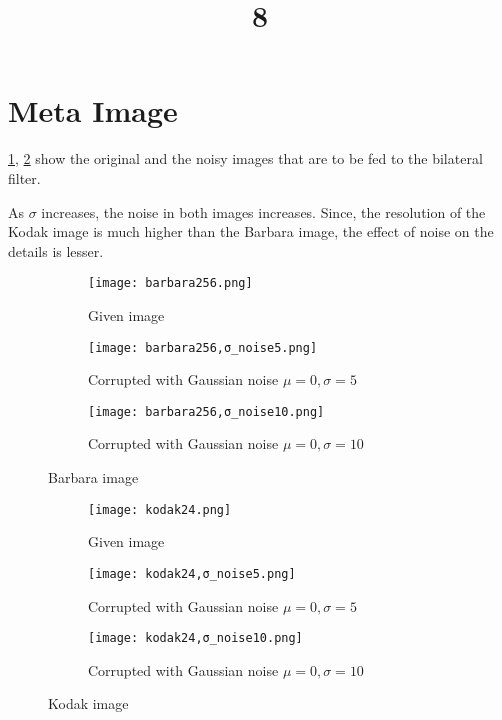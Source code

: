 \documentclass[a4paper, landscape]{article}
\title{8}
\date{}
\begin{document}
\maketitle
\section{Meta Image}
\ref{fig:bo}, \ref{fig:ko} show the original and the noisy images that are to be fed to  the bilateral filter.

As $\sigma$ increases, the noise in both images increases. 
Since, the resolution of the Kodak image is much higher than the Barbara image, the effect of noise on the details is lesser.
\begin{figure}
    \centering
    \begin{subfigure}{0.33\linewidth}
        \centering
        \texttt{[image: barbara256.png]}
        \caption{Given image}
    \end{subfigure}
    \begin{subfigure}{0.33\linewidth}
        \centering
        \texttt{[image: barbara256,σ\_noise5.png]}
        \caption{Corrupted with Gaussian noise $\mu=0, \sigma=5$}
    \end{subfigure}
    \begin{subfigure}{0.33\linewidth}
        \centering
        \texttt{[image: barbara256,σ\_noise10.png]}
        \caption{Corrupted with Gaussian noise $\mu=0, \sigma=10$}
    \end{subfigure}
    \caption{Barbara image}
    \label{fig:bo}
\end{figure}
\begin{figure}
    \centering
    \begin{subfigure}{0.33\linewidth}
        \centering
        \texttt{[image: kodak24.png]}
        \caption{Given image}
    \end{subfigure}
    \begin{subfigure}{0.33\linewidth}
        \centering
        \texttt{[image: kodak24,σ\_noise5.png]}
        \caption{Corrupted with Gaussian noise $\mu=0, \sigma=5$}
    \end{subfigure}
    \begin{subfigure}{0.33\linewidth}
        \centering
        \texttt{[image: kodak24,σ\_noise10.png]}
        \caption{Corrupted with Gaussian noise $\mu=0, \sigma=10$}
    \end{subfigure}
    \caption{Kodak image}
    \label{fig:ko}
\end{figure}
\end{document}
